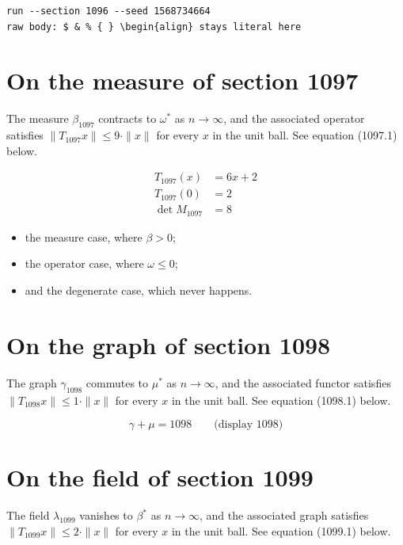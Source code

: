 \documentclass{article}
\begin{document}
\begin{verbatim}
run --section 1096 --seed 1568734664
raw body: $ & % { } \begin{align} stays literal here
\end{verbatim}

\section{On the measure of section 1097}
The measure $\beta_{1097}$ contracts to $\omega^{*}$ as $n \to \infty$,
and the associated operator satisfies $\|T_{1097} x\| \leq 9 \cdot \|x\|$
for every $x$ in the unit ball. See equation (1097.1) below.

\begin{align}
T_{1097}(x) &= 6 x + 2 \\
T_{1097}(0) &= 2 \\
\det M_{1097} &= 8
\end{align}

\begin{itemize}
  \item the measure case, where $\beta > 0$;
  \item the operator case, where $\omega \leq 0$;
  \item and the degenerate case, which never happens.
\end{itemize}

\section{On the graph of section 1098}
The graph $\gamma_{1098}$ commutes to $\mu^{*}$ as $n \to \infty$,
and the associated functor satisfies $\|T_{1098} x\| \leq 1 \cdot \|x\|$
for every $x$ in the unit ball. See equation (1098.1) below.

$$
\gamma + \mu = 1098 \qquad \text{(display 1098)}
$$

\section{On the field of section 1099}
The field $\lambda_{1099}$ vanishes to $\beta^{*}$ as $n \to \infty$,
and the associated graph satisfies $\|T_{1099} x\| \leq 2 \cdot \|x\|$
for every $x$ in the unit ball. See equation (1099.1) below.
\end{document}
